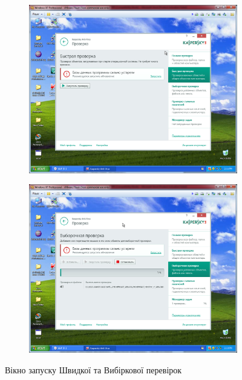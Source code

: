 \documentclass[
	a4paper,
	oneside,
	DIV = 12,
	fontsize = 13pt,
	headings = normal,
]{scrartcl}
\begin{document}
		\begin{figure}[!htbp]
			\centering
			\begin{subfigure}{0.5\textwidth}
				\centering
				\includegraphics[height = 9\baselineskip]{./assets/y03s01-pcdiag-lab-05-p09.PNG}
				\caption{}
				\label{subfig:kaspersky-scan-quick}
			\end{subfigure}%
			\begin{subfigure}{0.5\textwidth}
				\centering
				\includegraphics[height = 9\baselineskip]{./assets/y03s01-pcdiag-lab-05-p10.PNG}
				\caption{}
				\label{subfig:kaspersky-scan-selective-start}
			\end{subfigure}%
			\caption{Вікно запуску Швидкої та Вибіркової перевірок}
			\label{fig:kaspersky-scan-quick}
		\end{figure}
\end{document}
